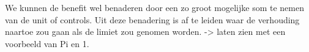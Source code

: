 We kunnen de benefit wel benaderen door een zo groot mogelijke som te nemen van de unit of controls. Uit deze benadering is af te leiden waar de verhouding naartoe zou gaan als de limiet zou genomen worden. -> laten zien met een voorbeeld van Pi en 1. 



%
%





